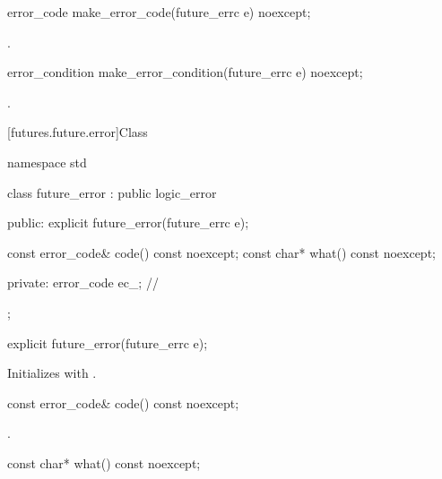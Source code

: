 %
\begin{itemdecl}
error_code make_error_code(future_errc e) noexcept;
\end{itemdecl}

\begin{itemdescr}
\pnum
\returns
{}.
\end{itemdescr}

%
\begin{itemdecl}
error_condition make_error_condition(future_errc e) noexcept;
\end{itemdecl}

\begin{itemdescr}
\pnum
\returns
{}.
\end{itemdescr}

[futures.future.error]{Class }

%
\begin{codeblock}
namespace std {
  class future_error : public logic_error {
  public:
    explicit future_error(future_errc e);

    const error_code& code() const noexcept;
    const char*       what() const noexcept;

  private:
    error_code ec_;             // \expos
  };
}
\end{codeblock}

%
\begin{itemdecl}
explicit future_error(future_errc e);
\end{itemdecl}

\begin{itemdescr}
\pnum
\effects
Initializes  with .
\end{itemdescr}

%
\begin{itemdecl}
const error_code& code() const noexcept;
\end{itemdecl}

\begin{itemdescr}
\pnum
\returns
{}.
\end{itemdescr}

%
\begin{itemdecl}
const char* what() const noexcept;
\end{itemdecl}

